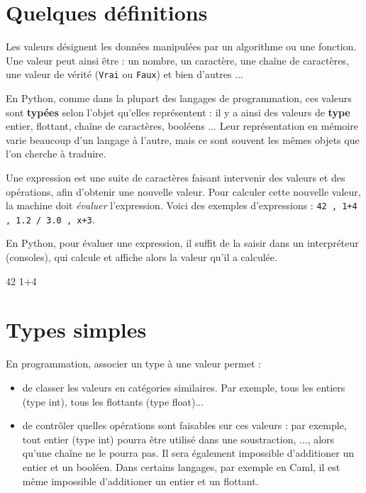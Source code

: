 \section{Quelques définitions}

\begin{defi}[Valeurs]
Les valeurs désignent les données manipulées par un algorithme ou une fonction. Une valeur 
peut ainsi être  : un nombre, un caractère, une chaîne de caractères, une valeur de vérité 
(\texttt{Vrai} ou \texttt{Faux}) et bien d'autres ... 

En Python, comme dans la plupart des langages 
de programmation, ces valeurs sont \textbf{typées} selon l'objet qu'elles représentent : il y a ainsi 
des valeurs de \textbf{type} entier, flottant, chaîne de caractères, booléens ...   Leur représentation en 
mémoire varie beaucoup d'un langage à l'autre, mais ce sont souvent les mêmes objets que l'on 
cherche à traduire.
\end{defi}

\begin{defi}[Expression]

Une expression est une suite de caractères faisant intervenir des valeurs et des 
opérations, afin d'obtenir une nouvelle valeur. Pour calculer cette nouvelle valeur,
la machine doit \emph{évaluer} l'expression. Voici des exemples d'expressions : \texttt{42 , 1+4 , 
1.2 / 3.0 , x+3}.

\end{defi}


\begin{xxpyconsole}%
En Python, pour évaluer une expression, il suffit de la saisir dans un interpréteur (consoles), qui
calcule et affiche alors la valeur qu'il a calculée.
\begin{pyconsole}
42
1+4
\end{pyconsole}
\end{xxpyconsole}


\section{Types simples}

En programmation, associer un type à une valeur permet :
\begin{itemize}
\item de classer les valeurs en catégories similaires. Par exemple, tous les
entiers (type int), tous les flottants (type float)...
\item de contrôler quelles opérations sont faisables sur ces valeurs : par
exemple, tout entier (type int) pourra être utilisé dans une soustraction, ..., alors 
qu'une chaîne ne le pourra pas. Il sera également impossible d'additioner un entier et un booléen. 
Dans certains langages, par exemple en Caml, il est même impossible d'additioner un entier et un 
flottant.                                             
\end{itemize}

